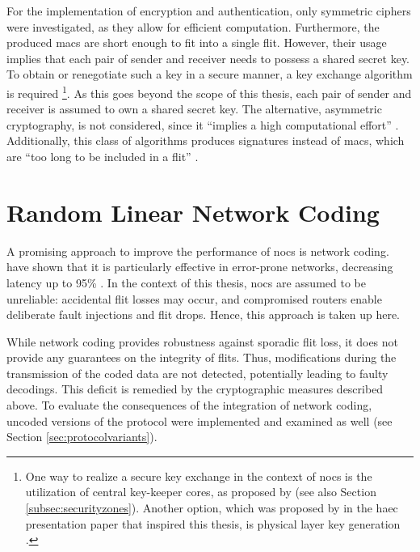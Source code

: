 For the implementation of encryption and authentication, only symmetric ciphers were investigated, as they allow for efficient computation.
Furthermore, the produced \glspl{mac} are short enough to fit into a single flit. However, their usage implies that each pair of
sender and receiver needs to possess a shared secret key. To obtain or renegotiate such a key in a secure manner, a key exchange algorithm is required
\footnote{One way to realize a secure key exchange in the context of \glspl{noc} is the utilization of central key-keeper cores, as proposed by
\citeauthor{gebotys03securityframework} \cite{gebotys03securityframework} (see also Section \ref{subsec:securityzones}). Another option, which was proposed by
\citeauthor{matthiesen17haec} in the \gls{haec} presentation paper that inspired this thesis, is physical layer key generation \cite[4]{matthiesen17haec}.}.
As this goes beyond the scope of this thesis, each pair of sender and receiver is assumed to own a shared secret key. The alternative, asymmetric
cryptography, is not considered, since it \enquote{implies a high computational effort} \cite[3]{moriam18activeattackers}. Additionally, this class of
algorithms produces signatures instead of \glspl{mac}, which are \enquote{too long to be included in a flit} \cite[3]{moriam18activeattackers}.

\section{Random Linear Network Coding}
A promising approach to improve the performance of \glspl{noc} is network coding. \citeauthor{moriam15manycorenc} have shown that it is particularly
effective in error-prone networks, decreasing latency up to 95\% \cite[7]{moriam15manycorenc}. In the context of this thesis, \glspl{noc} are assumed
to be unreliable: accidental flit losses may occur, and compromised routers enable deliberate fault injections and flit drops. Hence, this approach is
taken up here.

While network coding provides robustness against sporadic flit loss, it does not provide any guarantees on the integrity of flits. Thus, modifications
during the transmission of the coded data are not detected, potentially leading to faulty decodings. This deficit is remedied by the cryptographic
measures described above. To evaluate the consequences of the integration of network coding, uncoded versions of the protocol were implemented and
examined as well (see Section \ref{sec:protocolvariants}).

